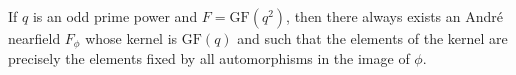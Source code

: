 If $q$ is an odd prime power and $F = \mathrm{GF}(q^2)$, then there always exists an André nearfield $F_\phi$ whose kernel is $\mathrm{GF}(q)$ and such that the elements of the kernel are precisely the elements fixed by all automorphisms in the image of $\phi$.